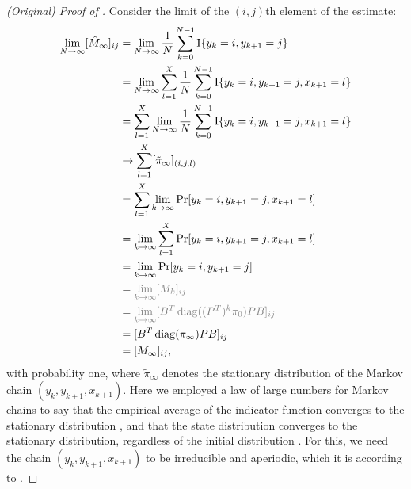 \documentclass[journal]{IEEEtran}
\begin{document}
{\begin{proof}[(Original) Proof of ]
   Consider the limit of the $(i,j)$th element of the estimate:
   \begin{align}
        \lim_{N\to \infty} [\hat M_\infty]_{ij} &= \lim_{N\to \infty} \frac{1}{N} \sum_{k=0}^{N-1}
        \ind{y_k = i, y_{k+1} = j} \notag \\
        &= \lim_{N\to \infty} \sum_{l=1}^X \frac{1}{N} \sum_{k=0}^{N-1} \ind{y_k = i, y_{k+1} = j,
        x_{k+1} = l} \notag \\
        &= \sum_{l=1}^X \lim_{N\to \infty} \frac{1}{N} \sum_{k=0}^{N-1} \ind{y_k = i, y_{k+1} = j,
        x_{k+1} = l} \notag \\
        &\rightarrow \sum_{l=1}^X [\tilde \pi_\infty]_{(i,j,l)} \notag \\
        &= \sum_{l=1}^X \lim_{k \to \infty} \Pr{y_k = i, y_{k+1} = j, x_{k+1} = l} \notag \\
        &= \lim_{k \to \infty} \sum_{l=1}^X \Pr{y_k = i, y_{k+1} = j, x_{k+1} = l} \notag \\
        &= \lim_{k \to \infty} \Pr{y_k = i, y_{k+1} = j} \notag \\
        &=\textcolor{gray}{\lim_{k \to \infty} [M_k]_{ij}} \notag \\
        &=\textcolor{gray}{\lim_{k \to \infty} [B^T \diag{(P^T)^k \pi_0} PB]_{ij}} \notag \\
        &= [B^T \diag{\pi_\infty} PB]_{ij} \notag \\
        &= [M_\infty]_{ij},
   \end{align}
    with probability one, where $\tilde \pi_\infty$ denotes the stationary
    distribution of the Markov chain $(y_k, y_{k+1}, x_{k+1})$. Here we
    employed a law of large numbers for Markov chains to say that the empirical
    average of the indicator function converges to the stationary distribution \cite[Theorem
    14.2.53]{cappe_inference_2005}, and that the state distribution converges to the
    stationary distribution, regardless of the initial distribution \cite[Proposition
    14.1.11]{cappe_inference_2005}. For this, we need the chain $(y_k, y_{k+1},
    x_{k+1})$ to be irreducible and aperiodic, which it is according to
    .
\end{proof}
}
\end{document}
